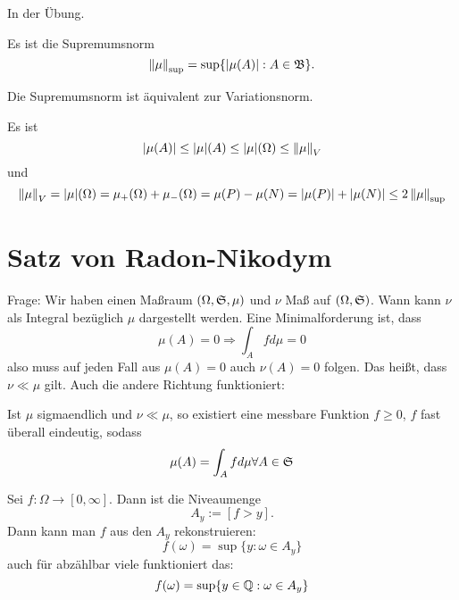 	\begin{bew}
		In der Übung.
	\end{bew}

	\begin{defi}
		Es ist die Supremumsnorm
		\[ \norm{\mu}_{\sup}=\sup\{|\mu(A)|: A\in\mf{B}\}. \]
	\end{defi}

	\begin{satz}
		Die Supremumsnorm ist äquivalent zur Variationsnorm.
	\end{satz}

	\begin{bew}
		Es ist
		\[ |\mu(A)|\le|\mu|(A)\le|\mu|(\Omega)\le\norm{\mu}_V \]
		und
		\[ \norm{\mu}_V=|\mu|(\Omega)=\mu_+(\Omega)+\mu_-(\Omega)=\mu(P)-\mu(N)=|\mu(P)|+|\mu(N)|\le2\norm{\mu}_{\sup} \]
	\end{bew}

\section{Satz von Radon-Nikodym}
	Frage: Wir haben einen Maßraum $(\Omega,\S,\mu)$ und $\nu$ Maß auf $(\Omega,\S)$. Wann kann $\nu$ als Integral bezüglich $\mu$ dargestellt werden. \newline
	Eine Minimalforderung ist, dass 
	\[ \mu(A)=0\Rightarrow \int_Afd\mu=0 \]
	also muss auf jeden Fall aus $\mu(A)=0$ auch $\nu(A)=0$ folgen. Das heißt, dass $\nu\ll\mu$ gilt.
	Auch die andere Richtung funktioniert:
	
	\begin{satz}
		Ist $\mu$ sigmaendlich und $\nu\ll\mu$, so existiert eine messbare Funktion $f\ge 0$, $f$ fast überall eindeutig, sodass
		\[ \mu(A)=\int_A fd\mu \forall A\in\S \]
	\end{satz} 

	\begin{bem}
		Sei $f:\Omega\to[0,\infty]$. Dann ist die Niveaumenge
		\[ A_y:=[f>y]. \]
		Dann kann man $f$ aus den $A_y$ rekonstruieren:
		\[ f(\omega)=\sup\{y: \omega\in A_y\} \]
		auch für abzählbar viele funktioniert das:
		\[ f(\omega)=\sup\{y\in\Q: \omega\in A_y\} \]
	\end{bem}

